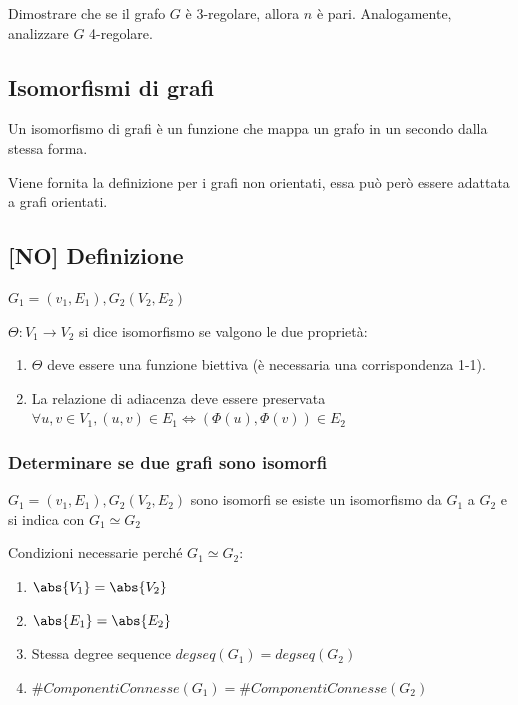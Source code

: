 \documentclass{article}
\providecommand{\tightlist}{%
  \setlength{\itemsep}{0pt}\setlength{\parskip}{0pt}}
\begin{document}
{{{Dimostrare che se il grafo $G$ è 3-regolare, allora $n$ è pari. Analogamente, analizzare $G$ 4-regolare. }

\hypertarget{h.d5v408sc7po0}{\subsection{\texorpdfstring{{Isomorfismi di
grafi}}{Isomorfismi di grafi}}\label{h.d5v408sc7po0}}

{Un isomorfismo di grafi è un funzione che mappa un grafo in un secondo dalla stessa forma.}

{Viene fornita la definizione per i grafi non orientati, essa può però essere adattata a grafi orientati.}

\subsection{{[}NO{]} Definizione}

$G_1=(v_1,E_1),G_2(V_2,E_2)$

{$\Theta:V_1\rightarrow V_2$ si dice isomorfismo se valgono le due proprietà:}

\begin{enumerate}
\tightlist
\item
  {$\Theta$ deve essere una funzione biettiva (è necessaria una corrispondenza 1-1).}
\item
  {La relazione di adiacenza deve essere preservata\\
  $\forall u,v \in V_1, (u,v) \in E_1 \iff (\Phi(u),\Phi(v)) \in E_2$}
\end{enumerate}

{}

\hypertarget{h.umjijdswjd6a}{\subsubsection{\texorpdfstring{{Determinare
se due grafi sono isomorfi}}{Determinare se due grafi sono isomorfi}}\label{h.umjijdswjd6a}}

{}

{$G_1=(v_1,E_1),G_2(V_2,E_2)$ sono isomorfi se esiste un isomorfismo da $G_1$ a $G_2$ e si indica con $G_1\simeq G_2$}


{Condizioni necessarie perché $G_1\simeq G_2$:}

\begin{enumerate}
\tightlist
\item
  $\abs{V_1}=\abs{V_2}$
\item
  $\abs{E_1}=\abs{E_2}$
\item
  {Stessa degree sequence $degseq(G_1) = degseq(G_2)$}
\item
  $\#ComponentiConnesse(G_1) = 	\#ComponentiConnesse(G_2)$
\end{enumerate}

}}
\end{document}
